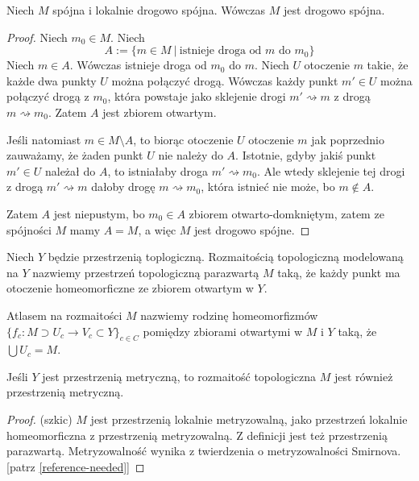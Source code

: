 \begin{lem} \label{lem:local-connectedness}
  Niech $M$ spójna i lokalnie drogowo spójna. Wówczas $M$ jest drogowo spójna.
  \begin{proof}
    Niech $m_0 \in M$. Niech
    \[
      A := \{m \in M\ |\ \mbox{istnieje droga od $m$ do $m_0$}\}
    \]
    Niech $m \in A$.
    Wówczas istnieje droga od $m_0$ do $m$.
    Niech $U$ otoczenie $m$ takie, że każde dwa punkty $U$ można połączyć drogą.
    Wówczas każdy punkt $m' \in U$ można połączyć drogą z $m_0$, która powstaje jako sklejenie drogi $m' \rightsquigarrow m$ z drogą $m \rightsquigarrow m_0$.
    Zatem $A$ jest zbiorem otwartym.
    
    Jeśli natomiast $m \in M \setminus A$, to biorąc otoczenie $U$ otoczenie $m$ jak poprzednio zauważamy, że żaden punkt $U$ nie należy do $A$. Istotnie, gdyby jakiś punkt $m' \in U$ należał do $A$, to istniałaby droga $m' \rightsquigarrow m_0$.
    Ale wtedy sklejenie tej drogi z drogą $m' \rightsquigarrow m$ dałoby drogę $m \rightsquigarrow m_0$, która istnieć nie może, bo $m \not\in A$.
    
    Zatem $A$ jest niepustym, bo $m_0 \in A$ zbiorem otwarto-domkniętym, zatem ze spójności $M$ mamy $A = M$, a więc $M$ jest drogowo spójne.
  \end{proof}
\end{lem}

\begin{df}
  Niech $Y$ będzie przestrzenią toplogiczną. Rozmaitością topologiczną modelowaną na $Y$ nazwiemy przestrzeń topologiczną parazwartą $M$ taką, że każdy punkt ma otoczenie homeomorficzne ze zbiorem otwartym w $Y$.
\end{df}

\begin{df}
  Atlasem na rozmaitości $M$ nazwiemy rodzinę homeomorfizmów $\{f_c : M \supset U_c \to V_c \subset Y\}_{c \in C}$ pomiędzy zbiorami otwartymi w $M$ i $Y$ taką, że $\bigcup U_c = M$.
\end{df}


\begin{fact} \label{fact:local-metrizability}
  Jeśli $Y$ jest przestrzenią metryczną, to rozmaitość topologiczna $M$ jest również przestrzenią metryczną.
  \begin{proof}(szkic)
    $M$ jest przestrzenią lokalnie metryzowalną, jako przestrzeń lokalnie homeomorficzna z przestrzenią metryzowalną. Z definicji jest też przestrzenią parazwartą. Metryzowalność wynika z twierdzenia o metryzowalności Smirnova. [patrz \ref{reference-needed}]
  \end{proof}
\end{fact}

